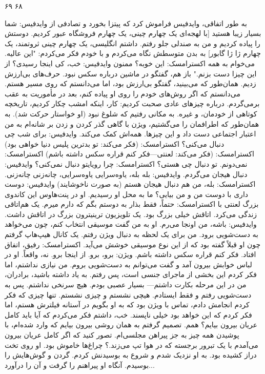 ۶۹  
۶۸  

به طور اتفاقی، وایدفیس فراموش کرد که پیتزا بخورد و تصادفی از  
وایدفیس: شما بسیار زیبا هستید [با لهجه‌ای یک چهارم چینی، یک چهارم  
فروشگاه عبور کردیم. دوستش را پیاده کردیم و من به صندلی جلو رفتم. داشتم  
انگلیسی، یک چهارم چینی ثروتمند، یک چهارم ژا ژا گابور]  
به بدن متوسطش نگاه می‌کردم و با خودم فکر می‌کردم: "این عالیه. می‌خوام به همه  
اکسترامسک: این خوبه؟ ممنون  
وایدفیس: خب، کی اینجا رسیدی؟ از این چیزا دست بزنم."  
باز هم، گفتگو در ماشین درباره سکس نبود. حرف‌های بی‌ارزش زدیم.  
همان‌طور که می‌بینید، گفتگو بی‌ارزش بود، اما می‌دانستم که روی مسیر هستم. می‌دانستم که اگر روش‌های خودم را روی او پیاده کنم، بعد در مأموریت به عقب برمی‌گردم.  
درباره چیزهای عادی صحبت کردیم: کار، اینکه امشب چکار کردیم، تاریخچه کوتاهی از خودمان، و غیره. به مکانی رفتیم که شلوغ نبود (او خواستار حرکت شد). به همان‌طور که اطرافمان را می‌گشتیم، ویژن با گاهی گذر کردن و زدن بر شانه‌ام به من اعتبار اجتماعی‌ دست داد و این چیزها. همه‌اش کمک می‌کند.  
وایدفیس: برای شب چی دنبال می‌کنی؟  
اکسترامسک: (فکر می‌کند: تو بدترین پلیس دنیا خواهی بود)  
اکسترامسک: (فکر می‌کند: لعنتی—فکر کنم قراره سکس داشته باشم)  
اکسترامسک: نمی‌دونم. تو دنبال چی هستی؟  
اکسترامسک: چرا رویایتو دنبال نمی‌کنی؟  
وایدفیس: دنبال هیجان می‌گردم.  
وایدفیس: بله بله، یاوه‌سرایی یاوه‌سرایی، چانه‌زنی چانه‌زنی.  
اکسترامسک: بله، من هم دنبال هیجان هستم (به صورت ناخوشایند)  
وایدفیس: دوست داری با دوست من و من بیایی؟  
ما به محل او رسیدیم. او در پنت‌هاوس این کاندوی بزرگ لعنتی با  
اکسترامسک: حتماً، فقط بذار به دوستم بگم که دارم میرم.  
یک هم‌اتاقی زندگی می‌کرد. اتاقش خیلی بزرگ بود. یک تلویزیون ترینیترون بزرگ در اتاقش داشت.  
وایدفیس: باشه، من اونجا می‌رم.  
او به من گفت موسیقی انتخاب کنم، چون می‌خواهد به دست‌شویی برود.  
من برای یک لحظه به دنبال ویژن رفتم. یک کانال هیپ‌هاپ گرفتم چون او قبلاً گفته بود که از این نوع موسیقی خوشش می‌آید.  
اکسترامسک: رفیق، اتفاق افتاد. فکر کنم قراره سکس داشته باشم.  
ویژن: برو، برو. از اینجا برو. نه، واقعاً. او در لباس خوابش بیرون آمد و گفت می‌توانم به دست‌شویی بروم. من نیازی نداشتم، اما فکر کردم این بخشی از ماجرای جنسی است، پس رفتم. به یاد داشته باشید، برادران، من در این مرحله بکارت داشتم—  
بسیار عصبی بودم. هیچ سرنخی نداشتم. پس به دست‌شویی رفتم و فقط ایستادم. هیچی نشستم و چیزی نشستم. تنها چیزی که فکر کردم انجامش دادم، تماس با  
ویژن بود که به او بگویم در آستانه فیلترش هستم، اما فکر کردم که این خواهد بود  
خیلی ناپسند.  
خب، داشتم فکر می‌کردم که آیا باید کامل عریان بیرون بیایم؟ همم. تصمیم گرفتم به همان روشی بیرون بیایم که وارد شده‌ام، با پوشیدن همه چیز به جز پیراهن مجلسی‌ام. تصور کنید که اگر کامل عریان بیرون می‌آمدم با یک تبرور برجسته که در هوا تپ می‌زند.؟  
چراغ‌ها خاموش بود. او روی تخت دراز کشیده بود. به او نزدیک شدم و شروع به بوسیدنش کردم. گردن و گوش‌هایش را بوسیدم. آنگاه او پیراهنم را گرفت و آن را درآورد...